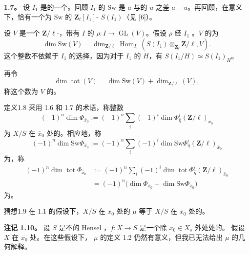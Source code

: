 \textbf{1.7。} 设 $I_1$ 是的一个。回顾 $I_1$ 的  $\mathrm{Sw}$ 是  $a$ 与的 $u$ 之差 $a-u$。再回顾，在意义下，恰有一个为 $\mathrm{Sw}$ 的 $\mathbf Z_\ell[I_1]$- $S(I_1)$（见 [6]）。

设 $V$ 是一个 $\mathbf Z/\ell$-，带有 $I$ 的 $\rho:I\to\operatorname{GL}(V)$。假设 $\rho$ 经 $I_1$ 。$V$ 的为
\[
\dim\mathrm{Sw}(V)=\dim_{\mathbf Z/\ell}
\operatorname{Hom}_{I_1}(S(I_1)\otimes_{\mathbf Z_\ell}\mathbf Z/\ell,V).
\tag{1.7.1}
\]
这个整数不依赖于 $I_1$ 的选择，因为对于 $I_1$ 的 $H$，有 $S(I_1/H)\simeq S(I_1)_H$。

再令
\[
\dim\operatorname{tot}(V)=\dim\mathrm{Sw}(V)+\dim_{\mathbf Z/\ell}(V),
\]
称这个数为 $V$ 的。

\begin{SGAresult}{定义}{1.8}
采用 1.6 和 1.7 的术语，称整数
\[
(-1)^n\dim\Phi_{\bar x_0}
\mathrel{:=}(-1)^n\sum_i(-1)^i\dim\Phi^i_{\bar\eta}(\mathbf Z/\ell)_{\bar x_0}
\]
为 $X/S$ 在 $\bar x_0$ 处的。相应地，称
\[
(-1)^n\dim\mathrm{Sw}\Phi_{\bar x_0}
\mathrel{:=}(-1)^n\sum_i(-1)^i\dim\mathrm{Sw}\Phi^i_{\bar\eta}(\mathbf Z/\ell)_{\bar x_0}
\]
为，称
\[
\begin{aligned}
(-1)^n\dim\operatorname{tot}\Phi_{\bar x_0}
&\mathrel{:=}(-1)^n\sum_i(-1)^i\dim\operatorname{tot}\Phi^i_{\bar\eta}(\mathbf Z/\ell)_{\bar x_0}\\
&=(-1)^n\bigl(\dim\Phi_{\bar x_0}+\dim\mathrm{Sw}\Phi_{\bar x_0}\bigr)
\end{aligned}
\]
为。
\end{SGAresult}

\begin{SGAresult}{猜想}{1.9}
在 1.1 的假设下，$X/S$ 在 $\bar x_0$ 处的  $\mu$ 等于 $X/S$ 在 $\bar x_0$ 处的。
\end{SGAresult}

\textbf{注记 1.10。} 设 $S$ 是不的 Hensel ，$f:X\to S$ 是一个除 $x_0\in X_s$ 外处处的。
假设 $X$ 在 $x_0$ 处。在这些假设下， $\mu$ 的定义 1.2 仍然有意义，但我已无法给出 $\mu$ 的几何解释。

